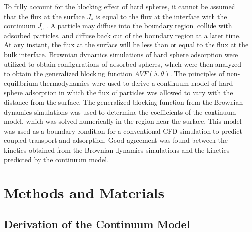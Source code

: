 To fully account for the blocking effect of hard spheres, it cannot
be assumed that the flux at the surface $J_{s}$ is equal to the flux
at the interface with the continuum $J_{c}$ . A particle may diffuse
into the boundary region, collide with adsorbed particles, and diffuse
back out of the boundary region at a later time. At any instant, the
flux at the surface will be less than or equal to the flux at the
bulk interface. Brownian dynamics simulations of hard sphere adsorption
were utilized to obtain configurations of adsorbed spheres, which
were then analyzed to obtain the generalized blocking function $AVF\left(h,\theta\right)$.
The principles of non-equilibrium thermodynamics were used to derive
a continuum model of hard-sphere adsorption in which the flux of particles
was allowed to vary with the distance from the surface. The generalized
blocking function from the Brownian dynamics simulations was used
to determine the coefficients of the continuum model, which was solved
numerically in the region near the surface. This model was used as
a boundary condition for a conventional CFD simulation to predict
coupled transport and adsorption. Good agreement was found between
the kinetics obtained from the Brownian dynamics simulations and the
kinetics predicted by the continuum model.


\section{Methods and Materials}


\subsection{Derivation of the Continuum Model }

